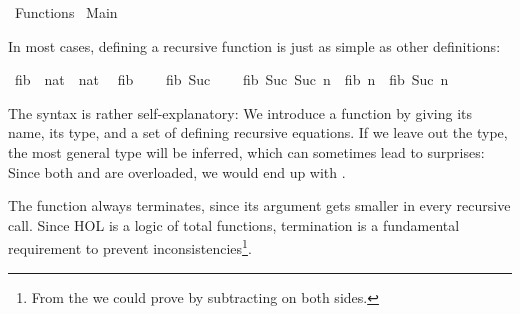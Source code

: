 %
\begin{isabellebody}%
\def\isabellecontext{Functions}%
%
\isadelimtheory
\isanewline
\isanewline
%
\endisadelimtheory
%
\isatagtheory
{}\isamarkupfalse%
\ Functions\isanewline
{}\ Main\isanewline
{}%
\endisatagtheory
{\isafoldtheory}%
%
\isadelimtheory
%
\endisadelimtheory
%
\isamarkuptrue%
%
\begin{isamarkuptext}%
In most cases, defining a recursive function is just as simple as other definitions:%
\end{isamarkuptext}%
\isamarkuptrue%
\isamarkupfalse%
\ fib\ {\isacharcolon}{\isacharcolon}\ {\isachardoublequoteopen}nat\ {\isasymRightarrow}\ nat{\isachardoublequoteclose}\isanewline
{}\isanewline
\ \ {\isachardoublequoteopen}fib\ {}\ {\isacharequal}\ {}{\isachardoublequoteclose}\isanewline
{\isacharbar}\ {\isachardoublequoteopen}fib\ {\isacharparenleft}Suc\ {}{\isacharparenright}\ {\isacharequal}\ {}{\isachardoublequoteclose}\isanewline
{\isacharbar}\ {\isachardoublequoteopen}fib\ {\isacharparenleft}Suc\ {\isacharparenleft}Suc\ n{\isacharparenright}{\isacharparenright}\ {\isacharequal}\ fib\ n\ {\isacharplus}\ fib\ {\isacharparenleft}Suc\ n{\isacharparenright}{\isachardoublequoteclose}%
\begin{isamarkuptext}%
The syntax is rather self-explanatory: We introduce a function by
  giving its name, its type, 
  and a set of defining recursive equations.
  If we leave out the type, the most general type will be
  inferred, which can sometimes lead to surprises: Since both  and \isa{{\isacharplus}} are overloaded, we would end up
  with .%
\end{isamarkuptext}%
\isamarkuptrue%
%
\begin{isamarkuptext}%
The function always terminates, since its argument gets smaller in
  every recursive call. 
  Since HOL is a logic of total functions, termination is a
  fundamental requirement to prevent inconsistencies\footnote{From the
    we could prove 
   by subtracting  on both sides.}.

\end{isamarkuptext}
\end{isabellebody}
